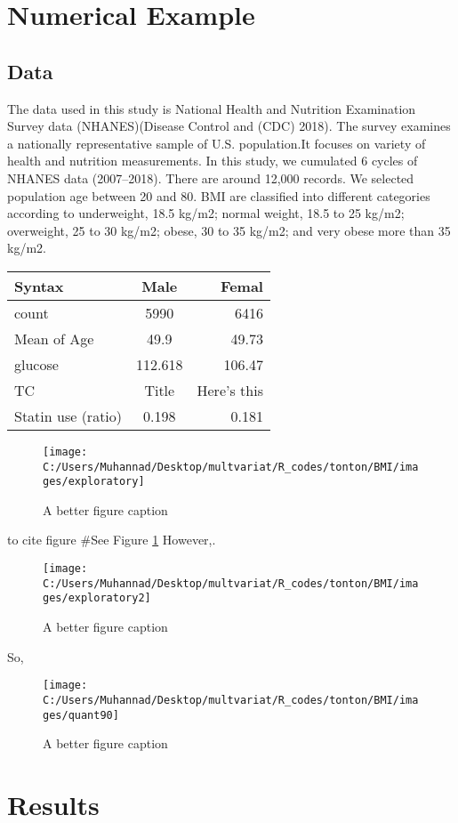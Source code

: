 \documentclass[12pt,]{article}
\begin{document}
\section{Numerical Example}\subsection{Data}

The data used in this study is National Health and Nutrition Examination
Survey data (NHANES)(Disease Control and (CDC) 2018). The survey
examines a nationally representative sample of U.S. population.It
focuses on variety of health and nutrition measurements. In this study,
we cumulated 6 cycles of NHANES data (2007--2018). There are around
12,000 records. We selected population age between 20 and 80. BMI are
classified into different categories according to underweight, 18.5
kg/m2; normal weight, 18.5 to 25 kg/m2; overweight, 25 to 30 kg/m2;
obese, 30 to 35 kg/m2; and very obese more than 35 kg/m2.

\begin{longtable}[]{@{}lcr@{}}
\toprule
Syntax & Male & Femal\tabularnewline
\midrule
\endhead
count & 5990 & 6416\tabularnewline
Mean of Age & 49.9 & 49.73\tabularnewline
glucose & 112.618 & 106.47\tabularnewline
TC & Title & Here's this\tabularnewline
Statin use (ratio) & 0.198 & 0.181\tabularnewline
\bottomrule
\end{longtable}

\begin{figure}

{\centering \texttt{[image: C:/Users/Muhannad/Desktop/multvariat/R\_codes/tonton/BMI/images/exploratory]} 

}

\caption{A better figure caption}\label{fig:data}
\end{figure}

to cite figure \#See Figure \ref{fig:data} However,.

\begin{figure}

{\centering \texttt{[image: C:/Users/Muhannad/Desktop/multvariat/R\_codes/tonton/BMI/images/exploratory2]} 

}

\caption{A better figure caption}\label{fig:unnamed-chunk-1}
\end{figure}

So,

\begin{figure}

{\centering \texttt{[image: C:/Users/Muhannad/Desktop/multvariat/R\_codes/tonton/BMI/images/quant90]} 

}

\caption{A better figure caption}\label{fig:unnamed-chunk-2}
\end{figure}\section{Results}
\end{document}
